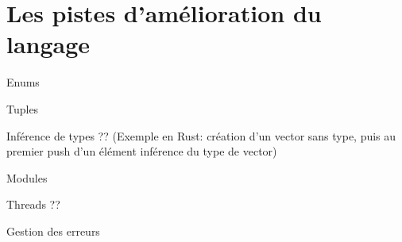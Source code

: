 \section{Les pistes d'amélioration du langage}


Enums

Tuples

Inférence de types ?? (Exemple en Rust: création d'un vector sans type, puis au premier push d'un élément inférence du type de vector)

Modules

Threads ??

Gestion des erreurs
